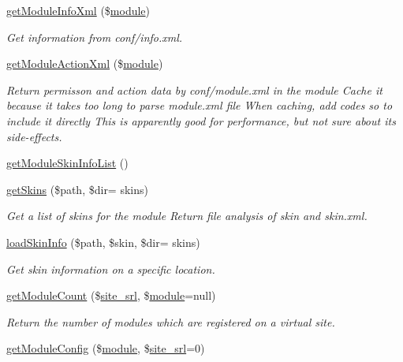 \begin{DoxyCompactItemize}
\hyperlink{classmoduleModel_ae4e9287674bddc605dfc4cef77f8c1bb}{get\+Module\+Info\+Xml} (\$\hyperlink{classmodule}{module})
\begin{DoxyCompactList}\small\item\em Get information from conf/info.\+xml. \end{DoxyCompactList}\item 
\hyperlink{classmoduleModel_a2d53da77f2504357f99b93a2ad09981a}{get\+Module\+Action\+Xml} (\$\hyperlink{classmodule}{module})
\begin{DoxyCompactList}\small\item\em Return permisson and action data by conf/module.\+xml in the module Cache it because it takes too long to parse module.\+xml file When caching, add codes so to include it directly This is apparently good for performance, but not sure about its side-\/effects. \end{DoxyCompactList}\item 
\hyperlink{classmoduleModel_a9fae8e7a41eda8e384cb46d25430ae82}{get\+Module\+Skin\+Info\+List} ()
\item 
\hyperlink{classmoduleModel_af48d0cb71ef8e732a67872f80d95f884}{get\+Skins} (\$path, \$dir= \textquotesingle{}skins\textquotesingle{})
\begin{DoxyCompactList}\small\item\em Get a list of skins for the module Return file analysis of skin and skin.\+xml. \end{DoxyCompactList}\item 
\hyperlink{classmoduleModel_af2f585723dfb8b8993f0e884136e45bb}{load\+Skin\+Info} (\$path, \$skin, \$dir= \textquotesingle{}skins\textquotesingle{})
\begin{DoxyCompactList}\small\item\em Get skin information on a specific location. \end{DoxyCompactList}\item 
\hyperlink{classmoduleModel_a2b22943c4d212c8284ef9780e0ebf3bd}{get\+Module\+Count} (\$\hyperlink{ko_8install_8php_a8b1406b4ad1048041558dce6bfe89004}{site\+\_\+srl}, \$\hyperlink{classmodule}{module}=null)
\begin{DoxyCompactList}\small\item\em Return the number of modules which are registered on a virtual site. \end{DoxyCompactList}\item 
\hyperlink{classmoduleModel_ae8005c8ab7ee3b9e6ddd7f71bb2b4698}{get\+Module\+Config} (\$\hyperlink{classmodule}{module}, \$\hyperlink{ko_8install_8php_a8b1406b4ad1048041558dce6bfe89004}{site\+\_\+srl}=0)

\end{DoxyCompactItemize}

